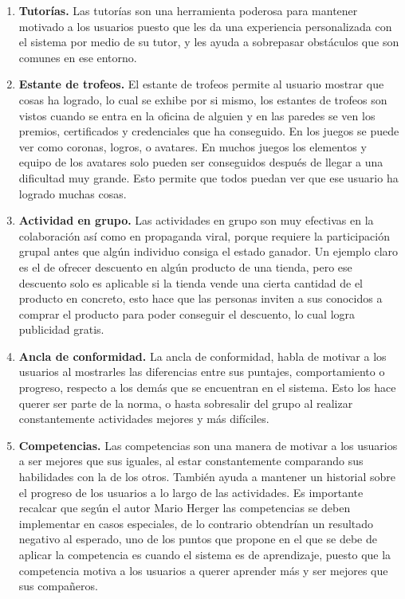     \begin{enumerate}
        
        \item \textbf{Tutorías.} \cite[p. 215]{libro2} Las tutorías son una herramienta poderosa para mantener motivado a los usuarios puesto que les da una experiencia personalizada con el sistema por medio de su tutor, y les ayuda a sobrepasar obstáculos que son comunes en ese entorno.
        
        \item \textbf{Estante de trofeos.} \cite[p. 218]{libro2} El estante de trofeos permite al usuario mostrar que cosas ha logrado, lo cual se exhibe por si mismo, los estantes de trofeos son vistos cuando se entra en la oficina de alguien y en las paredes se ven los premios, certificados y credenciales que ha conseguido. En los juegos se puede ver como coronas, logros, o avatares. En muchos juegos los elementos y equipo de los avatares solo pueden ser conseguidos después de llegar a una dificultad muy grande. Esto permite que todos puedan ver que ese usuario ha logrado muchas cosas. 
        
        \item \textbf{Actividad en grupo.} \cite[p. 221]{libro2} Las actividades en grupo son muy efectivas en la colaboración así como en propaganda viral, porque requiere la participación grupal antes que algún individuo consiga el estado ganador. Un ejemplo claro es el de ofrecer descuento en algún producto de una tienda, pero ese descuento solo es aplicable si la tienda vende una cierta cantidad de el producto en concreto, esto hace que las personas inviten a sus conocidos a comprar el producto para poder conseguir el descuento, lo cual logra publicidad gratis.
        
        \item \textbf{Ancla de conformidad.} \cite[p. 226]{libro2} La ancla de conformidad, habla de motivar a los usuarios al mostrarles las diferencias entre sus puntajes, comportamiento o progreso, respecto a los demás que se encuentran en el sistema. Esto los hace querer ser parte de la norma, o hasta sobresalir del grupo al realizar constantemente actividades mejores y más difíciles.
        
        \item \textbf{Competencias.} \cite[p. 210]{libro2} Las competencias son una manera de motivar a los usuarios a ser mejores que sus iguales, al estar constantemente comparando sus habilidades con la de los otros. También ayuda a mantener un historial sobre el progreso de los usuarios a lo largo de las actividades. Es importante recalcar que según el autor Mario Herger \cite{libro25} las competencias se deben implementar en casos especiales, de lo contrario obtendrían un resultado negativo al esperado, uno de los puntos que propone en el que se debe de aplicar la competencia es cuando el sistema es de aprendizaje, puesto que la competencia motiva a los usuarios a querer aprender más y ser mejores que sus compañeros.
        
    \end{enumerate}
    
